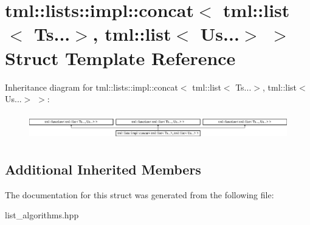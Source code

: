 \hypertarget{structtml_1_1lists_1_1impl_1_1concat_3_01tml_1_1list_3_01Ts_8_8_8_4_00_01tml_1_1list_3_01Us_8_8_8_4_01_4}{\section{tml\+:\+:lists\+:\+:impl\+:\+:concat$<$ tml\+:\+:list$<$ Ts...$>$, tml\+:\+:list$<$ Us...$>$ $>$ Struct Template Reference}
\label{structtml_1_1lists_1_1impl_1_1concat_3_01tml_1_1list_3_01Ts_8_8_8_4_00_01tml_1_1list_3_01Us_8_8_8_4_01_4}
}
Inheritance diagram for tml\+:\+:lists\+:\+:impl\+:\+:concat$<$ tml\+:\+:list$<$ Ts...$>$, tml\+:\+:list$<$ Us...$>$ $>$\+:\begin{figure}[H]
\begin{center}
\leavevmode
\includegraphics[height=1.138211cm]{structtml_1_1lists_1_1impl_1_1concat_3_01tml_1_1list_3_01Ts_8_8_8_4_00_01tml_1_1list_3_01Us_8_8_8_4_01_4}
\end{center}
\end{figure}
\subsection*{Additional Inherited Members}


The documentation for this struct was generated from the following file\+:\begin{DoxyCompactItemize}
\item 
list\+\_\+algorithms.\+hpp\end{DoxyCompactItemize}
